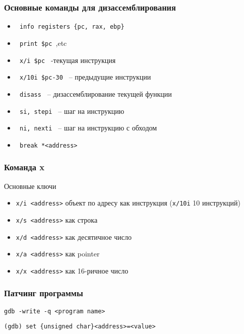 \begin{frame}[fragile]
  \frametitle{Основные команды для дизассемблирования}
  \begin{itemize}
    \item \verb+ info registers {pc, rax, ebp} +
    \item \verb+ print $pc +,etc
    \item \verb+ x/i $pc + -текущая инструкция
    \item \verb+ x/10i $pc-30 + -- предыдущие инструкции
    \item \verb+ disass + -- дизассемблирование текущей функции
    \item \verb+ si, stepi + -- шаг на инструкцию
    \item \verb+ ni, nexti + -- шаг на инструкцию с обходом
    \item \verb+ break *<address> +
  \end{itemize}
\end{frame}

\begin{frame}
  \frametitle{Команда x}
  Основные ключи
  \begin{itemize}
    \item \texttt{x/i <address>} объект по адресу как инструкция (\texttt{x/10i} 10 инструкций)
    \item \texttt{x/s <address>} как строка
    \item \texttt{x/d <address>} как десятичное число
    \item \texttt{x/a <address>} как pointer
    \item \texttt{x/x <address>} как 16-ричное число
  \end{itemize}
\end{frame}

\begin{frame}[fragile]
  \frametitle{Патчинг программы}
  \begin{verbatim}
gdb -write -q <program name>
  \end{verbatim}
\pause
\vspace{2ex}
  \begin{verbatim}
(gdb) set {unsigned char}<address>=<value>
  \end{verbatim}
\end{frame}

